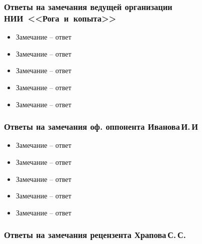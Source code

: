 \begin{frame}
    \frametitle{Ответы на замечания ведущей организации НИИ~<<Рога~и~копыта>>}
    \begin{itemize}
        \item Замечание -- ответ
        \item Замечание -- ответ
        \item Замечание -- ответ
        \item Замечание -- ответ
        \item Замечание -- ответ
    \end{itemize}
\end{frame}

\begin{frame}
    \frametitle{Ответы на замечания оф. оппонента Иванова\,И.\,И}
    \begin{itemize}
        \item Замечание -- ответ
        \item Замечание -- ответ
        \item Замечание -- ответ
        \item Замечание -- ответ
        \item Замечание -- ответ
    \end{itemize}
\end{frame}

\begin{frame}
    \frametitle{Ответы на замечания рецензента Храпова\,С.\,С.}
\end{frame}

